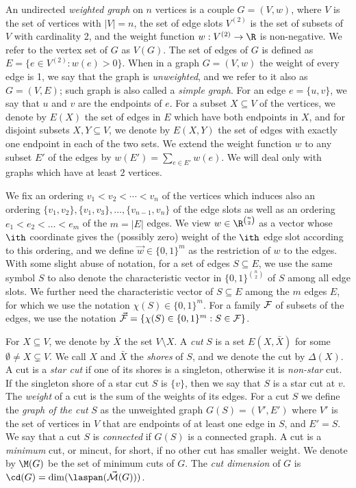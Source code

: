 An undirected {\em weighted graph} on $n$ vertices is a couple
$G = (V,w)$, where $V$ is the set of vertices with $|V| = n$,
the set of edge slots
$V^{(2)}$ is the
set of subsets of $V$ with cardinality 2, and the weight function
$w : V^{(2)} \rightarrow \R $ is non-negative. We refer to the vertex set of $G$ as $V(G)$.
The set of edges of $G$
is defined as $E = \{e \in V^{(2)} : w(e) > 0\}$.
When in a graph $G=(V,w)$ the weight of every edge is 1, we say that the graph is {\em unweighted},
and we refer to it also as $G=(V,E)$; such graph is also called a {\em simple graph}.
For an edge $e = \{u,v\} $, we say that $u$ and $v$ are the endpoints of $e$.
For a subset $X \subseteq V$ of the vertices, we denote by $E(X)$ the set of edges in $E$
which have both endpoints in $X$, and for disjoint subsets $X, Y \subseteq V$, we denote by
$E(X, Y)$ the set of edges with exactly one endpoint in each of the two sets.
We extend the weight function $w$ to any subset $E'$ of the edges by $w(E') = \sum_{e \in E'} w(e)$.
We will deal only with graphs which have at least $2$ vertices.

We fix an ordering
$v_1 < v_2 < \cdots < v_n$ of the vertices which induces also an ordering $\{v_1, v_2\}, \{v_1, v_3\}, \ldots, \{v_{n-1},v_n\}$ of the edge slots as well as an ordering $e_1 < e_2 < \ldots < e_m$ of the $m=|E|$ edges.  We view $w \in \R^{\binom{n}{2}}$ as a vector whose $\ith$ coordinate gives the (possibly zero) weight of the $\ith$ edge slot
according to this ordering,
and we define $\vec{w} \in \{0,1\}^m$ as the restriction of $w$ to the edges.
With some slight abuse of notation, for a set of edges $S \subseteq E$, we use the same symbol $S$ to also denote
the characteristic vector in $\{0,1\}^{\binom{n}{2}}$ of $S$ among all edge slots.
We further need the characteristic vector of $S \subseteq E$ among the $m$ edges $E$, for which we use the
notation $\chi(S) \in \{0,1\}^m$.
For a family ${\cal F}$ of subsets of the edges, we use the notation
$\vec{{\cal F}} = \{ \chi(S) \in \{0,1\}^m : S \in {\cal F}\}$.


For $X \subseteq V$, we denote by $\bar{X}$ the set $V \setminus X$.
A {\em cut} $S$ is a set $E(X, \bar{X})$ for some $\emptyset \neq X \subsetneq V$.
We call
$X$ and $\bar{X}$ the {\em shores} of $S$, and we denote the cut by $\Delta(X)$.
A cut is a {\em star cut} if one of its shores is a singleton,
otherwise it is {\em non-star} cut. If the singleton shore of a star cut $S$ is $\{v\}$, then we say that $S$ is a star cut
at $v$.  The {\em weight} of a cut is the sum of the weights of its edges.
For a cut $S$ we define the {\em graph of the cut} $S$ as the unweighted graph $G(S)= (V', E')$
where $V'$ is the set of vertices in $V$
that are endpoints of at least one edge in $S$, and $E'=S$.
We say that a cut $S$ is
{\em connected} if $G(S)$ is a connected graph.
A cut is a {\em minimum} cut, or mincut, for short, if no other cut has smaller weight.
We denote by $\M(G)$ be the set of minimum cuts of $G$.
The {\em cut dimension} of $G$ is $\cd(G) = \dim(\laspan(\vec{\cal{M}}(G)))$.

